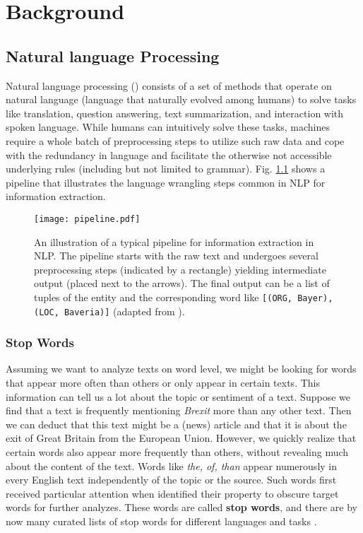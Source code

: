 \chapter{Background}

\section{Natural language Processing}
  Natural language processing () consists of a set of methods that operate on natural language (language that naturally evolved among humans) to solve tasks like translation, question answering, text summarization, and interaction with spoken language.
  While humans can intuitively solve these tasks, machines require a whole batch of preprocessing steps to utilize such raw data and cope with the redundancy in language and facilitate the otherwise not accessible underlying rules (including but not limited to grammar).
  Fig. \ref{fig:pipeline} shows a pipeline that illustrates the language wrangling steps common in NLP for information extraction.

\begin{figure}[h!]
  \centering
  \texttt{[image: pipeline.pdf]}
  \caption{An illustration of a typical pipeline for information extraction in NLP. The pipeline starts with the raw text and undergoes several preprocessing steps (indicated by a rectangle) yielding intermediate output (placed next to the arrows). The final output can be a list of tuples of the entity and the corresponding word like \texttt{[(ORG, \textquotesingle Bayer\textquotesingle), (LOC, \textquotesingle Baveria\textquotesingle)]} (adapted from \cite{Bird2009}).}
\label{fig:pipeline}
\end{figure}

\subsection{Stop Words}
  Assuming we want to analyze texts on word level, we might be looking for
  words that appear more often than others or only appear in certain texts.
  This information can tell us a lot about the topic or sentiment of a text.
  Suppose we find that a text is frequently mentioning \textit{Brexit} more than any other text.
  Then we can deduct that this text might be a (news) article and that it is about the exit of Great Britain from the European Union.
  However, we quickly realize that certain words also appear more frequently than others, without revealing much about the content of the text.
  Words like \textit{the, of, than} appear numerously in every English text independently of the topic or the source.
  Such words first received particular attention when \cite{Luhn1960} identified their property to obscure target words for further analyzes.
  These words are called \textbf{stop words}, and there are by now many curated lists of stop words for different languages and tasks \citep{RANKS2019}.

